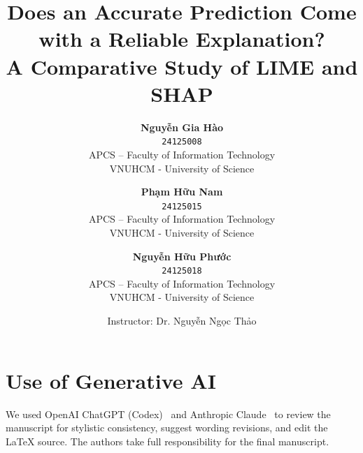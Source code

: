 \documentclass[10pt,a4paper,twocolumn]{article}
\title{\textbf{\fontsize{13.5pt}{15.5pt}\selectfont Does an Accurate Prediction Come with a Reliable Explanation?}\\[0.25em]
\fontsize{11pt}{13pt}\selectfont\textbf{A Comparative Study of LIME and SHAP}}
\author{
    \textbf{Nguyễn Gia Hào} \\
    \texttt{24125008} \\
    \small APCS -- Faculty of Information Technology \\
    \small VNUHCM - University of Science
    \and
    \textbf{Phạm Hữu Nam} \\
    \texttt{24125015} \\
    \small APCS -- Faculty of Information Technology \\
    \small VNUHCM - University of Science
    \and
    \textbf{Nguyễn Hữu Phước} \\
    \texttt{24125018} \\
    \small APCS -- Faculty of Information Technology \\
    \small VNUHCM - University of Science
}
\date{\small Instructor: Dr. Nguyễn Ngọc Thảo}
\begin{document}
\twocolumn[
  \begin{@twocolumnfalse}
    \maketitle
    
    \vspace{1.2em}
  \end{@twocolumnfalse}
]







\section*{Use of Generative AI}
We used OpenAI ChatGPT (Codex)~\cite{openai-codex} and Anthropic
Claude~\cite{anthropic-claude} to review the manuscript for stylistic
consistency, suggest wording revisions, and edit the \LaTeX{} source.
The authors take full responsibility for the final manuscript.



\clearpage
\appendix
{}

\end{document}
